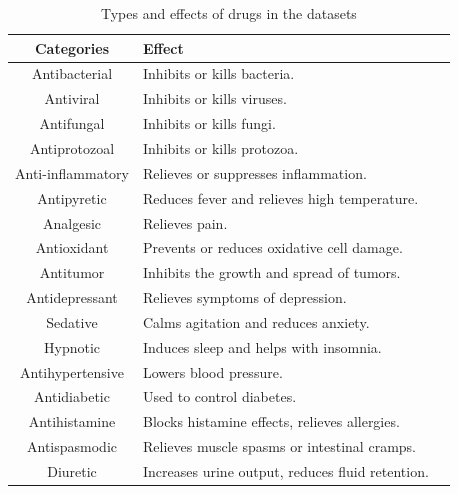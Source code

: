 \documentclass{mcmthesis}
\begin{document}
\begin{table}[h!]
\centering
\begin{tabular}{|c|l|p{10cm}|}
\hline
\textbf{Categories} & \textbf{Effect} \\ \hline
Antibacterial & Inhibits or kills bacteria. \\ \hline
Antiviral & Inhibits or kills viruses. \\ \hline
Antifungal & Inhibits or kills fungi. \\ \hline
Antiprotozoal & Inhibits or kills protozoa. \\ \hline
Anti-inflammatory & Relieves or suppresses inflammation. \\ \hline
Antipyretic & Reduces fever and relieves high temperature. \\ \hline
Analgesic & Relieves pain. \\ \hline
Antioxidant & Prevents or reduces oxidative cell damage. \\ \hline
Antitumor & Inhibits the growth and spread of tumors. \\ \hline
Antidepressant & Relieves symptoms of depression. \\ \hline
Sedative & Calms agitation and reduces anxiety. \\ \hline
Hypnotic & Induces sleep and helps with insomnia. \\ \hline
Antihypertensive & Lowers blood pressure. \\ \hline
Antidiabetic & Used to control diabetes. \\ \hline
Antihistamine & Blocks histamine effects, relieves allergies. \\ \hline
Antispasmodic & Relieves muscle spasms or intestinal cramps. \\ \hline
Diuretic & Increases urine output, reduces fluid retention. \\ \hline
\end{tabular}
\caption{Types and effects of drugs in the datasets}
\label{table:medical_terms}
\end{table}
\end{document}
